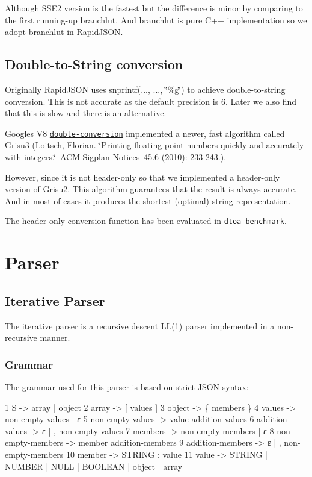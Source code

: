 Although S\+S\+E2 version is the fastest but the difference is minor by comparing to the first running-\/up {\ttfamily branchlut}. And {\ttfamily branchlut} is pure C++ implementation so we adopt {\ttfamily branchlut} in Rapid\+J\+S\+ON.\hypertarget{md_Commun_Externe_RapidJSON_doc_internals_dtoa}{}\subsection{Double-\/to-\/\+String conversion}\label{md_Commun_Externe_RapidJSON_doc_internals_dtoa}
Originally Rapid\+J\+S\+ON uses {\ttfamily snprintf(..., ..., \char`\"{}\%g\char`\"{})} to achieve double-\/to-\/string conversion. This is not accurate as the default precision is 6. Later we also find that this is slow and there is an alternative.

Google\textquotesingle{}s V8 \href{https://github.com/floitsch/double-conversion}{\tt double-\/conversion} implemented a newer, fast algorithm called Grisu3 (Loitsch, Florian. \char`\"{}\+Printing floating-\/point numbers quickly and accurately with integers.\char`\"{} \+A\+CM Sigplan Notices 45.6 (2010)\+: 233-\/243.).

However, since it is not header-\/only so that we implemented a header-\/only version of Grisu2. This algorithm guarantees that the result is always accurate. And in most of cases it produces the shortest (optimal) string representation.

The header-\/only conversion function has been evaluated in \href{https://github.com/miloyip/dtoa-benchmark}{\tt dtoa-\/benchmark}.\hypertarget{md_Commun_Externe_RapidJSON_doc_internals_Parser}{}\section{Parser}\label{md_Commun_Externe_RapidJSON_doc_internals_Parser}
\hypertarget{md_Commun_Externe_RapidJSON_doc_internals_IterativeParser}{}\subsection{Iterative Parser}\label{md_Commun_Externe_RapidJSON_doc_internals_IterativeParser}
The iterative parser is a recursive descent L\+L(1) parser implemented in a non-\/recursive manner.\hypertarget{md_Commun_Externe_RapidJSON_doc_internals_IterativeParserGrammar}{}\subsubsection{Grammar}\label{md_Commun_Externe_RapidJSON_doc_internals_IterativeParserGrammar}
The grammar used for this parser is based on strict J\+S\+ON syntax\+: 
\begin{DoxyCode}
1 S -> array | object
2 array -> [ values ]
3 object -> \{ members \}
4 values -> non-empty-values | ε
5 non-empty-values -> value addition-values
6 addition-values -> ε | , non-empty-values
7 members -> non-empty-members | ε
8 non-empty-members -> member addition-members
9 addition-members -> ε | , non-empty-members
10 member -> STRING : value
11 value -> STRING | NUMBER | NULL | BOOLEAN | object | array
\end{DoxyCode}


